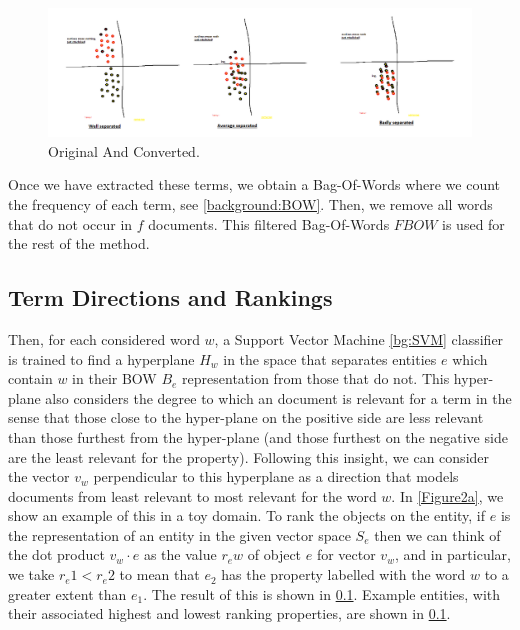 \begin{figure}[t]
	\includegraphics[width=\textwidth]{images/genres_separated.png}
	\centering
	\caption{Original And Converted.}\label{ch3:OrigAndConverted}
\end{figure}

Once we have extracted these terms, we obtain a Bag-Of-Words where we count the frequency of each term, see \ref{background:BOW}. Then, we remove all words that do not occur in $f$ documents. This filtered Bag-Of-Words $FBOW$ is used for the rest of the method.

\subsection{Term Directions and Rankings}

Then, for each considered word $w$, a Support Vector Machine \ref{bg:SVM} classifier is trained to find a hyperplane $H_w$ in the space that separates entities $e$ which contain $w$ in their BOW $B_e$ representation from those that do not. This hyper-plane also considers the degree to which an document is relevant for a term in the sense that those close to the hyper-plane on the positive side are less relevant than those furthest from the hyper-plane (and those furthest on the negative side are the least relevant for the property). Following this insight, we can consider the vector $v_w$ perpendicular to this hyperplane as a direction that models documents from least relevant to most relevant for the word $w$. In \ref{Figure2a}, we show an example of this in a toy domain. %
To rank the objects on the entity, if $e$ is the representation of an entity in the given vector space $S_e$ then we can think of the dot product $v_w \cdot e$ as the value $r_ew$ of object $e$ for vector $v_w$, and in particular, we take $r_e1 < r_e2$ to mean that $e_2$ has the property labelled with the word $w$ to a greater extent than $e_1$. The result of this is shown in \ref{}. Example entities, with their associated highest and lowest ranking properties, are shown in \ref{}. %

